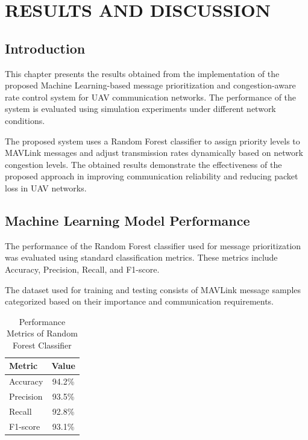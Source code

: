 \chapter{RESULTS AND DISCUSSION}


\section{Introduction}

This chapter presents the results obtained from the 
implementation of the proposed Machine Learning-based 
message prioritization and congestion-aware rate control 
system for UAV communication networks. The performance 
of the system is evaluated using simulation experiments 
under different network conditions.

The proposed system uses a Random Forest classifier 
to assign priority levels to MAVLink messages and 
adjust transmission rates dynamically based on 
network congestion levels. The obtained results 
demonstrate the effectiveness of the proposed 
approach in improving communication reliability 
and reducing packet loss in UAV networks.



\section{Machine Learning Model Performance}

The performance of the Random Forest classifier 
used for message prioritization was evaluated 
using standard classification metrics. These 
metrics include Accuracy, Precision, Recall, 
and F1-score.

The dataset used for training and testing 
consists of MAVLink message samples categorized 
based on their importance and communication 
requirements.

\begin{table}[H]
\centering
\small
\caption{Performance Metrics of Random Forest Classifier}
\begin{tabular}{|l|c|}
\hline

Metric & Value \\

\hline

Accuracy & 94.2\% \\

Precision & 93.5\% \\

Recall & 92.8\% \\

F1-score & 93.1\% \\

\hline

\end{tabular}
\end{table}

